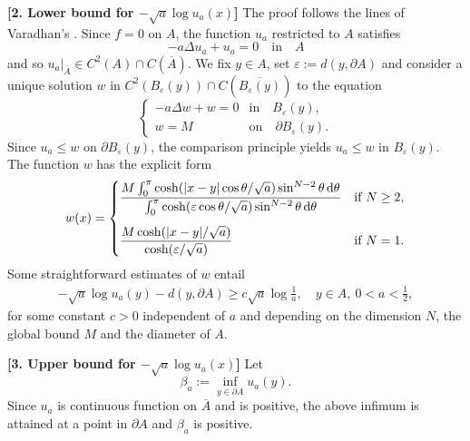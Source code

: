 \documentclass[graybox]{svmult}
\newcommand{\ep}{\varepsilon}
\renewcommand{\d}{\mathrm{d}}  %
\renewcommand{\AA}{A}  %
\begin{document}
\vspace{3mm}
\noindent
\textbf{[2. Lower bound for $-\sqrt{a} \log u_a(x)$]\hspace{2mm}}  The proof follows the lines of Varadhan's \cite{V67}. Since $f=0$ on $\AA$, the function $u_a$ restricted to $\AA$ satisfies  
\[
-a\Delta u_a+u_a = 0 \quad \text{in} \quad \AA 
\] 
and so $u_a|_{\overline{\AA}} \in C^2 (\AA) \cap C(\overline{\AA})$. 
We fix $y \in \AA$, set $\ep:= d(y,\partial \AA)$ and consider a unique solution $w$ in $C^2 (B_\ep(y)) \cap C(\overline{B_\ep(y)})$ to the equation
\begin{equation}
   \begin{cases}
-a\Delta w+ w = 0 &\text{in} \quad B_\ep(y),\\
w=M&\text{on} \quad \partial B_\ep(y). 
\end{cases}
\end{equation}
Since $u_a \le w$ on $\partial B_\ep(y)$, the comparison principle yields $u_a \le w$ in $B_\ep(y)$.  The function $w$ has the explicit form
\begin{equation}\label{eq:w}
w(x)=
\begin{cases}
\displaystyle \frac{M\int_0^\pi \cosh(|x-y|\cos \theta/\sqrt{a})\sin^{N-2}\theta\, \d \theta}{\int_0^\pi \cosh(\ep\cos \theta/\sqrt{a})\sin^{N-2}\theta\, \d \theta}
&\text{if } N\ge 2, 
\vspace{3mm}\\
\displaystyle \frac{ M\cosh(|x-y|/\sqrt{a})}{ \cosh(\ep/\sqrt{a})}
&\text{if } N=1. 
\end{cases}
\end{equation}
 Some straightforward estimates of $w$ entail 
\begin{align} 
-\sqrt{a}\log u_a(y)-d(y,\partial \AA)
\ge 
c \sqrt{a} \log \frac1{a}, \quad y\in \AA,~ 0 < a <\frac1{2},     \label{eq:lower}
\end{align}
for some constant $c>0$ independent of $a$ and depending on the dimension $N$, the global bound $M$ and the diameter of $\AA$. 

\vspace{3mm}
\noindent
\textbf{[3. Upper bound for $-\sqrt{a} \log u_a(x)$]\hspace{2mm}}  Let 
\[
\beta_a :=\inf_{y\in\partial \AA}u_a(y).   
\]
Since $u_a$ is continuous function on $\overline{\AA}$ and is positive, the above infimum is attained at a point in $\partial \AA$ and $\beta_a$ is positive. 
\end{document}
